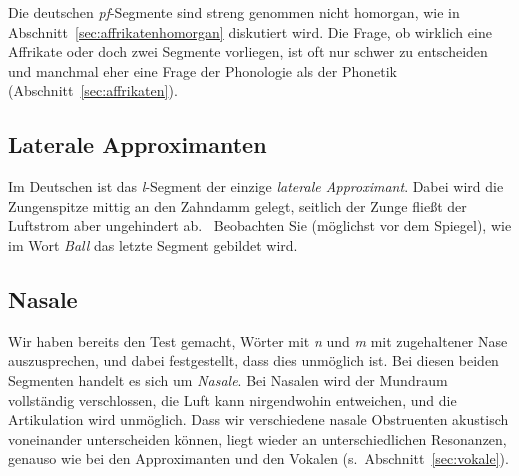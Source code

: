 
Die deutschen \textit{pf}-Segmente sind \zB streng genommen nicht homorgan, wie in Abschnitt~\ref{sec:affrikatenhomorgan} diskutiert wird.
Die Frage, ob wirklich eine Affrikate oder doch zwei Segmente vorliegen, ist oft nur schwer zu entscheiden und manchmal eher eine Frage der Phonologie als der Phonetik (Abschnitt~\ref{sec:affrikaten}).

\subsection{Laterale Approximanten}

Im Deutschen ist das \textit{l}-Segment der einzige \textit{laterale Approximant}.
Dabei wird die Zungenspitze mittig an den Zahndamm gelegt, seitlich der Zunge fließt der Luftstrom aber ungehindert ab.
\TuBegin~Beobachten Sie (möglichst vor dem Spiegel), wie im Wort \textit{Ball} das letzte Segment gebildet wird.


\subsection{Nasale}

Wir haben bereits den Test gemacht, Wörter mit \textit{n} und \textit{m} mit zugehaltener Nase auszusprechen, und dabei festgestellt, dass dies unmöglich ist.
Bei diesen beiden Segmenten handelt es sich um \textit{Nasale}.
Bei Nasalen wird der Mundraum vollständig verschlossen, die Luft kann nirgendwohin entweichen, und die Artikulation wird unmöglich.
Dass wir verschiedene nasale Obstruenten akustisch voneinander unterscheiden können, liegt wieder an unterschiedlichen Resonanzen, genauso wie bei den Approximanten und den Vokalen (s.\ Abschnitt~\ref{sec:vokale}).


